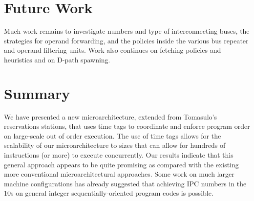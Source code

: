 \documentclass[10pt,dvips]{article}
\begin{document}
\section{Future Work}

Much work remains to investigate numbers and type of interconnecting
buses, the strategies for operand forwarding, and the policies inside
the various bus repeater and operand filtering units.
Work also continues on fetching policies and heuristics and on
D-path spawning.

\section{Summary}

We have presented a new microarchitecture, extended from Tomasulo's
reservations stations, that uses time tags to coordinate and enforce
program order on large-scale out of order execution.
The use of time tags allows for the scalability of our microarchitecture
to sizes that can allow for hundreds of instructions (or more) to execute
concurrently.
Our results indicate that this general approach appears to be quite
promising as compared with the existing more conventional microarchitectural
approaches.  Some work on much larger machine configurations has already
suggested that achieving IPC numbers in the 10s on general integer
sequentially-oriented program codes is possible.



\end{document}
